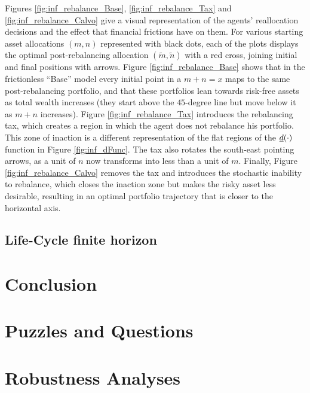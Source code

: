 \documentclass[./RiskyContrib.tex]{subfiles}
\begin{document}




Figures \ref{fig:inf_rebalance_Base}, \ref{fig:inf_rebalance_Tax} and
\ref{fig:inf_rebalance_Calvo} give a visual representation of the agents'
reallocation decisions and the effect that financial frictions have on them.
For various starting asset allocations $(m,n)$ represented with black dots,
each of the plots displays the optimal post-rebalancing allocation
$(\tilde{m},\tilde{n})$  with a red cross, joining initial and final positions
with arrows. Figure \ref{fig:inf_rebalance_Base} shows that in the frictionless
``Base'' model every initial point in a $m+n=x$ maps to the same post-rebalancing
portfolio, and that these portfolios lean towards risk-free assets as total wealth
increases (they start above the $45$-degree line but move below it as $m+n$ increases).
Figure \ref{fig:inf_rebalance_Tax} introduces the rebalancing tax, which creates
a region in which the agent does not rebalance his portfolio. This zone of
inaction is a different representation of the flat regions of the $\underline{d}(\cdot)$
function in Figure \ref{fig:inf_dFunc}. The tax also rotates the south-east pointing
arrows, as a unit of $n$ now transforms into less than a unit of $m$. Finally,
Figure \ref{fig:inf_rebalance_Calvo} removes the tax and introduces the stochastic
inability to rebalance, which closes the inaction zone but makes the risky asset
less desirable, resulting in an optimal portfolio trajectory that is closer to
the horizontal axis.


\subsection{Life-Cycle finite horizon}



\hypertarget{Conclusion}{}
\section{Conclusion}

\hypertarget{Puzzles-and-Questions}{}
\section{Puzzles and Questions}\label{sec:Puzzles}

\hypertarget{Robustness Analyses}{}
\section{Robustness Analyses}

\clearpage\vfill\eject

\onlyinsubfile{}
\end{document}
